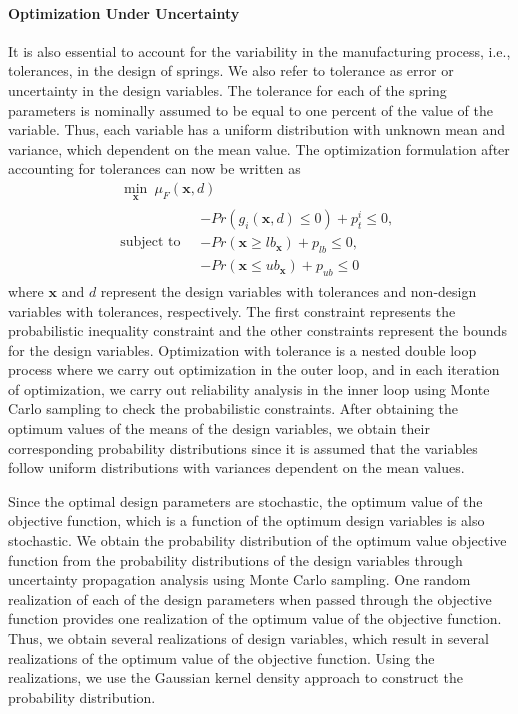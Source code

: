 \documentclass[10pt]{article}
\begin{document}
\paragraph{Optimization Under Uncertainty} It is also essential to account for the variability in the manufacturing process, i.e., tolerances, in the design of springs. We also refer to tolerance as error or uncertainty in the design variables. The tolerance for each of the spring parameters is nominally assumed to be equal to one percent of the value of the variable. Thus, each variable has a uniform distribution with unknown mean and variance, which dependent on the mean value. The optimization formulation after accounting for tolerances can now be written as 
\begin{equation}
				\begin{gathered}
	 				\min_{\mathbf{x}} \ \mu_{F} (\mathbf{x},d) \\
	 				\mbox{subject to} \quad 
					\begin{split}
					-Pr(g_{i}(\mathbf{x},d) \leq 0) + p_{t}^{i} \le 0, \\
					-Pr(\mathbf{x} \geq lb_{\mathbf{x}}) + p_{lb} \le 0, \\
					-Pr(\mathbf{x} \leq ub_{\mathbf{x}}) + p_{ub} \le 0
					\end{split}
				\end{gathered}
			\end{equation}
where $\mathbf{x}$ and $d$ represent the design variables with tolerances and non-design variables with tolerances, respectively. The first constraint represents the probabilistic inequality constraint and the other constraints represent the bounds for the design variables. Optimization with tolerance is a nested double loop process where we carry out optimization in the outer loop, and in each iteration of optimization, we carry out reliability analysis in the inner loop using Monte Carlo sampling to check the probabilistic constraints. After obtaining the optimum values of the means of the design variables, we obtain their corresponding probability distributions since it is assumed that the variables follow uniform distributions with variances dependent on the mean values. 

Since the optimal design parameters are stochastic, the optimum value of the objective function, which is a function of the optimum design variables is also stochastic. We obtain the probability distribution of the optimum value objective function from the probability distributions of the design variables through uncertainty propagation analysis using Monte Carlo sampling. One random realization of each of the design parameters when passed through the objective function provides one realization of the optimum value of the objective function. Thus, we obtain several realizations of design variables, which result in several realizations of the optimum value of the objective function. Using the realizations, we use the Gaussian kernel density approach to construct the probability distribution.
\end{document}

